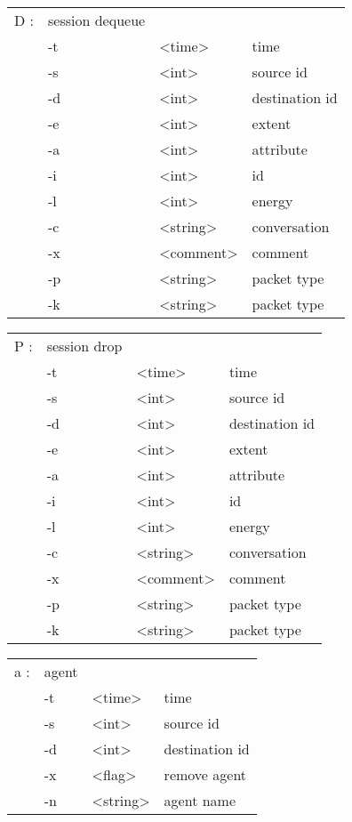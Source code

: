  \begin{tabular}{llll}
  D : & session dequeue & & \\
    &  -t & <time> & time \\
    &  -s & <int> & source id \\
    &  -d & <int> & destination id \\
    &  -e & <int> & extent \\
    &  -a & <int> & attribute \\
    &  -i & <int> & id \\
    &  -l & <int> & energy \\
    &  -c & <string> & conversation \\
    &  -x & <comment> & comment \\
    &  -p & <string> & packet type \\
    &  -k & <string> & packet type \\
  \end{tabular}

  \begin{tabular}{llll}
  P : & session drop & & \\
    &  -t & <time> & time \\
    &  -s & <int> & source id \\
    &  -d & <int> & destination id \\
    &  -e & <int> & extent \\
    &  -a & <int> & attribute \\
    &  -i & <int> & id \\
    &  -l & <int> & energy \\
    &  -c & <string> & conversation \\
    &  -x & <comment> & comment \\
    &  -p & <string> & packet type \\
    &  -k & <string> & packet type \\
  \end{tabular}

  \begin{tabular}{llll}
  a : & agent & & \\
    &  -t & <time> & time \\
    &  -s & <int> & source id \\
    &  -d & <int> & destination id \\
    &  -x & <flag> & remove agent \\
    &  -n & <string> & agent name \\
  \end{tabular}

